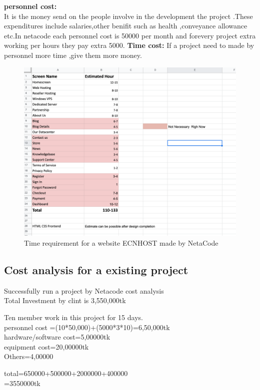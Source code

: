 \documentclass[a4paper,12pt]{report}
\begin{document}
	\subitem \textbf{personnel cost:\\}It is the money send on the people involve in the development the project .These expenditures include salaries,other benifit such as health ,conveyance allowance etc.In netacode
	each personnel cost is 50000 per month and forevery project extra working per hours they pay extra 5000.
	\subitem \textbf{Time cost:} 
	If a project need to made by personnel more time ,give them more money.
	\newpage
\begin{figure}[h]
	\centering
	\includegraphics[width=1\linewidth]{8_1}
	\caption{Time requirement for a website ECNHOST made by NetaCode }
	\label{fig:81}
\end{figure}
\subsection{Cost analysis for a existing project}
Successfully run a project by Netacode cost analysis\\
Total Investment by clint is 3,550,000tk
\begin{center}
	 Ten member work in this project for 15 days.\\
 personnel cost =(10*50,000)+(5000*3*10)=6,50,000tk\\
 hardware/software cost=5,00000tk\\
 equipment cost=20,00000tk\\
 Others=4,00000\\
\end{center}
 \begin{center}
 	total=650000+500000+2000000+400000\\
 	      =3550000tk\\
 \end{center}
\end{document}
